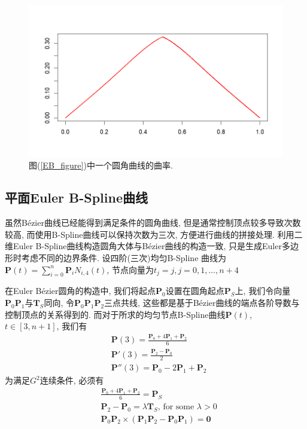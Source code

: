 \documentclass[utf8]{ctexart} %
\begin{document}
	 \begin{figure}[htbp]
	 	\centering
	 	\includegraphics[width=0.7\linewidth]{figures/SixEdges_EulerBezier.png}
	 	\caption{图(\ref{EB_figure})中一个圆角曲线的曲率. }
	 \end{figure}
	 \subsection{平面Euler B-Spline曲线}
	 虽然B\'ezier曲线已经能得到满足条件的圆角曲线, 但是通常控制顶点较多导致次数较高, 而使用B-Spline曲线可以保持次数为三次, 方便进行曲线的拼接处理. 利用二维Euler B-Spline曲线构造圆角大体与B\'{e}zier曲线的构造一致, 只是生成Euler多边形时考虑不同的边界条件.  设四阶(三次)均匀B-Spline 曲线为$\boldsymbol{P}(t)=\sum_{i=0}^n\boldsymbol{P}_iN_{i,4}(t)$, 节点向量为$t_j = j,j=0,1,\dots,n+4$ \par 
	 在Euler B\'{e}zier圆角的构造中, 我们将起点$\boldsymbol{P}_0$设置在圆角起点$\boldsymbol{P}_S$上, 我们令向量$\boldsymbol{P}_0\boldsymbol{P}_1$与$\boldsymbol{T}_S$同向, 令$\boldsymbol{P}_0$$\boldsymbol{P}_1$$\boldsymbol{P}_2$三点共线, 这些都是基于B\'{e}zier曲线的端点各阶导数与控制顶点的关系得到的. 而对于所求的均匀节点B-Spline曲线$\boldsymbol{P}(t)$, $t\in[3,n+1]$, 我们有
	 \begin{equation}
	 \begin{aligned}
	 &\boldsymbol{P}(3)=\frac{\boldsymbol{P}_0+4\boldsymbol{P}_1+\boldsymbol{P}_2}6\\
	 &\boldsymbol{P}'(3)=\frac{\boldsymbol{P}_2-\boldsymbol{P}_0}2\\
	 &\boldsymbol{P}''(3)=\boldsymbol{P}_0-2\boldsymbol{P}_1+\boldsymbol{P}_2
	 \end{aligned}
	 \end{equation}
	 为满足$G^2$连续条件, 必须有
	 \begin{equation}\label{EBS_condition}
	 \begin{aligned}
	 &\frac{\boldsymbol{P}_0+4\boldsymbol{P}_1+\boldsymbol{P}_2}6=\boldsymbol{P}_S\\
	 &\boldsymbol{P}_2-\boldsymbol{P}_0=\lambda\boldsymbol{T}_S\text{, for some }\lambda>0\\
	 &\boldsymbol{P}_0\boldsymbol{P}_2\times(\boldsymbol{P}_1\boldsymbol{P}_2-\boldsymbol{P}_0\boldsymbol{P}_1)=\boldsymbol{0}
	 \end{aligned}
	 \end{equation}
\end{document}
